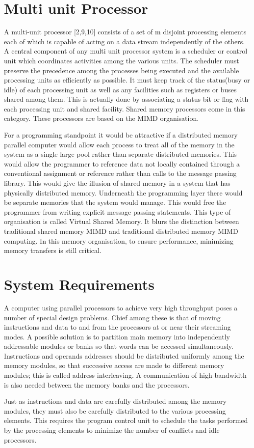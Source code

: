 \section{Multi unit Processor}
A multi-unit processor [2,9,10] consists of a set of m disjoint processing elements each of which is capable of acting on a data stream independently of the
others. A central component of any multi unit processor system is a scheduler or control unit which coordinates activities among the various units. The
scheduler must preserve the precedence among the processes being executed and the available processing units as efficiently as possible. It must keep track
of the status(busy or idle) of each processing unit as well as any facilities such as registers or buses shared among them. This is actually done by
associating a status bit or flag with each processing unit and shared facility. Shared memory processors come in this category. These processors are based 
on the MIMD organisation.\par
\hspace{1in}For a programming standpoint it would be attractive if a distributed memory parallel computer would allow each process to treat all of the
memory in the system as a single large pool rather than separate distributed memories. This would
allow the programmer to reference data not locally contained through a conventional assignment or reference rather than calls to the message passing library.
This would give the illusion of shared memory in a system that has physically distributed memory. Underneath the programming layer there would be separate
memories that the system would manage. This would free the programmer from writing explicit message passing statements. This type of organisation is called
Virtual Shared Memory. It blurs the distinction between traditional shared memory MIMD and traditional distributed memory MIMD computing. In this memory
organisation, to ensure performance, minimizing memory transfers is still critical.


\section{System Requirements}
A computer using parallel processors to achieve very high throughput poses a number of special design  problems. Chief among these is that of moving
instructions and data to and from the processors at or near their streaming modes. A possible solution is to partition main memory into independently
addressable modules or banks so that words can be accessed simultaneously. Instructions and operands addresses should be distributed uniformly among the
memory modules, so that successive access are made to different memory modules; this is called address interleaving. A communication of high bandwidth is
also needed between the memory banks and the processors. \par
\hspace{1in} Just as instructions and data are carefully distributed among the memory modules, they must also be carefully distributed to the various
processing elements. This requires the program control unit to schedule the tasks performed by the processing elements to minimize the number of conflicts
and idle processors.

